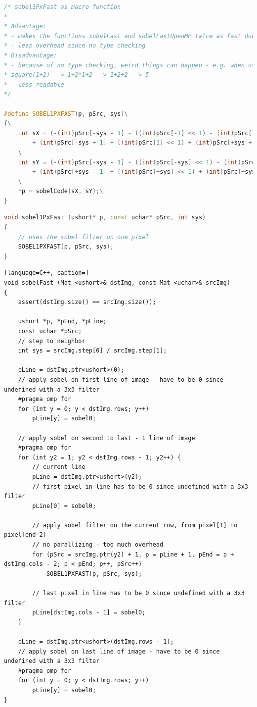 \documentclass{ezb}
\begin{document}
\begin{lstlisting}[language=C++, caption=sobel1PxFast as macro function]
/* sobel1PxFast as macro function
* 
* Advantage:
* - makes the functions sobelFast and sobelFastOpenMP twice as fast due to forced inlining
* - less overhead since no type checking
* Disadvantage:
* - because of no type checking, weird things can happen - e.g. when used with expressions such as (1+2): #define square(a) a*a
* square(1+2) --> 1+2*1+2 --> 1+2+2 --> 5 
* - less readable
*/

#define SOBEL1PXFAST(p, pSrc, sys)\
{\
	int sX = (-(int)pSrc[-sys - 1] - ((int)pSrc[-1] << 1) - (int)pSrc[+sys - 1]\
		+ (int)pSrc[-sys + 1] + ((int)pSrc[1] << 1) + (int)pSrc[+sys + 1] + 3) >> 3;\
	\
	int sY = (-(int)pSrc[-sys - 1] - ((int)pSrc[-sys] << 1) - (int)pSrc[-sys + 1]\
		+ (int)pSrc[+sys - 1] + ((int)pSrc[+sys] << 1) + (int)pSrc[+sys + 1] + 3) >> 3;\
	\
	*p = sobelCode(sX, sY);\
}
\end{lstlisting}
\newpage
\begin{lstlisting}[language=C++, caption=Core routine for \textbackslash c sobelFast]
void sobel1PxFast (ushort* p, const uchar* pSrc, int sys)
{
	// uses the sobel filter on one pixel
	SOBEL1PXFAST(p, pSrc, sys);
}
\end{lstlisting}

\begin{lstlisting}[language=C++, caption=]
void sobelFast (Mat_<ushort>& dstImg, const Mat_<uchar>& srcImg)
{
	assert(dstImg.size() == srcImg.size()); 

	ushort *p, *pEnd, *pLine; 
	const uchar *pSrc; 
	// step to neighbor
	int sys = srcImg.step[0] / srcImg.step[1];

	pLine = dstImg.ptr<ushort>(0);
	// apply sobel on first line of image - have to be 0 since undefined with a 3x3 filter
	#pragma omp for
	for (int y = 0; y < dstImg.rows; y++)
		pLine[y] = sobel0;

	// apply sobel on second to last - 1 line of image
	#pragma omp for
	for (int y2 = 1; y2 < dstImg.rows - 1; y2++) {
		// current line
		pLine = dstImg.ptr<ushort>(y2);
		// first pixel in line has to be 0 since undefined with a 3x3 filter
		pLine[0] = sobel0;

		// apply sobel filter on the current row, from pixel[1] to pixel[end-2]
		// no parallizing - too much overhead
		for (pSrc = srcImg.ptr(y2) + 1, p = pLine + 1, pEnd = p + dstImg.cols - 2; p < pEnd; p++, pSrc++)
			SOBEL1PXFAST(p, pSrc, sys);

		// last pixel in line has to be 0 since undefined with a 3x3 filter
		pLine[dstImg.cols - 1] = sobel0;
	}

	pLine = dstImg.ptr<ushort>(dstImg.rows - 1);
	// apply sobel on last line of image - have to be 0 since undefined with a 3x3 filter
	#pragma omp for
	for (int y = 0; y < dstImg.rows; y++)
		pLine[y] = sobel0;
}
\end{lstlisting}
\end{document}
